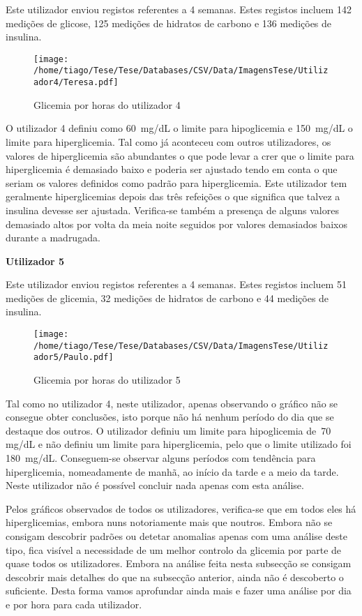 Este utilizador enviou registos referentes a 4 semanas. Estes registos incluem 142 medições de glicose, 125 medições de hidratos de carbono e 136 medições de insulina.
\begin{figure}[H]
\centering
\texttt{[image: /home/tiago/Tese/Tese/Databases/CSV/Data/ImagensTese/Utilizador4/Teresa.pdf]}
\caption{Glicemia por horas do utilizador 4}
\label{fig:uti4}
\end{figure}
O utilizador 4 definiu como 60~mg/dL o limite para hipoglicemia e 150~mg/dL o limite para hiperglicemia. Tal como já aconteceu com outros utilizadores, os valores de hiperglicemia são abundantes o que pode levar a crer que o limite para hiperglicemia é demasiado baixo e poderia ser ajustado tendo em conta o que seriam os valores definidos como padrão para hiperglicemia. Este utilizador tem geralmente hiperglicemias depois das três refeições o que significa que talvez a insulina devesse ser ajustada. Verifica-se também a presença de alguns valores demasiado altos por volta da meia noite seguidos por valores demasiados baixos durante a madrugada. 


\textbf{Utilizador 5}

Este utilizador enviou registos referentes a 4 semanas. Estes registos incluem 51 medições de glicemia, 32 medições de hidratos de carbono e 44 medições de insulina.
\begin{figure}[H]
\centering
\texttt{[image: /home/tiago/Tese/Tese/Databases/CSV/Data/ImagensTese/Utilizador5/Paulo.pdf]}
\caption{Glicemia por horas do utilizador 5}
\label{fig:uti5}
\end{figure}
Tal como no utilizador 4, neste utilizador, apenas observando o gráfico não se consegue obter conclusões, isto porque não há nenhum período do dia que se destaque dos outros. O utilizador definiu um limite para hipoglicemia de~70 mg/dL e não definiu um limite para hiperglicemia, pelo que o limite utilizado foi 180~mg/dL. Conseguem-se observar alguns períodos com tendência para hiperglicemia, nomeadamente de manhã, ao início da tarde e a meio da tarde. Neste utilizador não é possível concluir nada apenas com esta análise.\newline

Pelos gráficos observados de todos os utilizadores, verifica-se que em todos eles há hiperglicemias, embora nuns notoriamente mais que noutros. Embora não se consigam descobrir padrões ou detetar anomalias apenas com uma análise deste tipo, fica visível a necessidade de um melhor controlo da glicemia por parte de quase todos os utilizadores. Embora na análise feita nesta subsecção se consigam descobrir mais detalhes do que na subsecção anterior, ainda não é descoberto o suficiente. Desta forma vamos aprofundar ainda mais e fazer uma análise por dia e por hora para cada utilizador.


